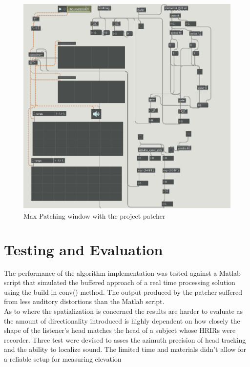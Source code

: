 \documentclass[a4paper,12pt,oneside]{article}
\begin{document}
\begin{center}
\begin{figure}[H]
\includegraphics[scale=0.6]{patcher.png}
 \caption{Max Patching window with the project patcher}
    \label{fig:patc}
\end{figure}
\end{center}  

\section{Testing and Evaluation}

The performance of the algorithm implementation was tested against a Matlab script that simulated the buffered approach of a real time processing solution using the build in conv() method. The output produced by the patcher suffered from less auditory distortions than the Matlab script.\\

As to where the spatialization is concerned the results are harder to evaluate as the amount of directionality introduced is highly dependent on how closely the shape of the listener's head matches the head of a subject whose HRIRs were recorder. Three test were devised to asses the azimuth precision of head tracking and the ability to localize sound. The limited time and materials didn't allow for a reliable setup for measuring elevation\\
\end{document}
